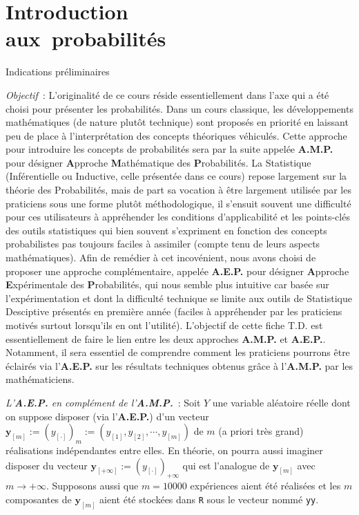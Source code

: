 \documentclass[10pt]{report}
\begin{document}
\chapter{Introduction\\ aux~probabilités}\label{TdProb}
\begin{IndicList}{Indications préliminaires} 
\item \textit{Objectif}~: L'originalité de ce cours réside essentiellement dans l'axe qui a été choisi pour présenter les probabilités. Dans un cours classique, les développements mathématiques (de nature plutôt technique) sont proposés en priorité en laissant peu de place à l'interprétation des concepts théoriques véhiculés. Cette approche pour introduire les concepts de probabilités sera par la suite appelée \textbf{A.M.P.} pour désigner \textbf{A}pproche \textbf{M}athématique des \textbf{P}robabilités. La Statistique (Inférentielle ou Inductive, celle présentée dans ce cours) repose largement sur la théorie des Probabilités, mais de part sa vocation à être largement utilisée  par les praticiens sous une forme plutôt méthodologique, il s'ensuit souvent une difficulté pour ces utilisateurs à appréhender les conditions d'applicabilité et les points-clés des outils statistiques qui bien souvent s'expriment en fonction des concepts probabilistes pas toujours faciles à assimiler (compte tenu de leurs aspects mathématiques). Afin de remédier à cet incovénient, nous avons choisi de proposer une approche complémentaire, appelée  \textbf{A.E.P.} pour désigner \textbf{A}pproche \textbf{E}xpérimentale des \textbf{P}robabilités, qui nous semble plus intuitive car basée sur l'expérimentation et dont la difficulté technique se limite aux outils de Statistique Desciptive présentés en première année (faciles à appréhender par les praticiens motivés surtout lorsqu'ils en ont l'utilité). L'objectif de cette fiche T.D. est essentiellement de faire le lien entre les deux approches \textbf{A.M.P.} et \textbf{A.E.P.}. Notamment, il sera essentiel de comprendre comment les praticiens pourrons être éclairés via  l'\textbf{A.E.P.}  sur les résultats techniques obtenus grâce à l'\textbf{A.M.P.} par les mathématiciens. 
\item \textit{L'\textbf{A.E.P.} en complément de l'\textbf{A.M.P.}}~: Soit $Y$ une variable aléatoire réelle dont on suppose disposer (via l'\textbf{A.E.P.}) d'un vecteur $\textbf{y}_{[m]}:=(y_{[\cdot]})_m:=(y_{[1]},y_{[2]},\cdots,y_{[m]})$ de $m$ (a priori très grand) réalisations indépendantes entre elles. En théorie, on pourra aussi imaginer disposer du vecteur $\textbf{y}_{[+\infty]}:=(y_{[\cdot]})_{+\infty}$ qui est l'analogue de $\textbf{y}_{[m]}$ avec $m\rightarrow +\infty$. Supposons  aussi que $m=10000$ expériences aient été réalisées et les $m$ composantes de $\textbf{y}_{[m]}$ aient été stockées dans \texttt{R} sous le vecteur nommé \texttt{yy}.


\end{IndicList}
\end{document}

